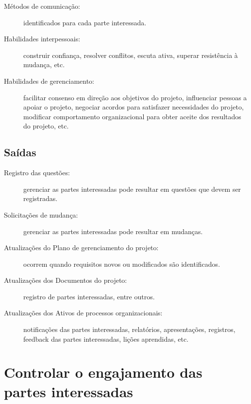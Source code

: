 \begin{description}
	
	\item[Métodos de comunicação:] identificados para cada parte interessada.
	
	\item[Habilidades interpessoais:] construir confiança, resolver conflitos, escuta ativa, superar resistência à mudança, etc.
	
	\item[Habilidades de gerenciamento:] facilitar consenso em direção aos objetivos do projeto, influenciar pessoas a apoiar o projeto, negociar acordos para satisfazer necessidades do projeto, modificar comportamento organizacional para obter aceite dos resultados do projeto, etc.
	
\end{description}

\section{Saídas}

\begin{description}
	
	\item[Registro das questões:] gerenciar as partes interessadas pode resultar em questões que devem ser registradas.
	
	\item[Solicitações de mudança:] gerenciar as partes interessadas pode resultar em mudanças.
	
	\item[Atualizações do Plano de gerenciamento do projeto:] ocorrem quando requisitos novos ou modificados são identificados.
	
	\item[Atualizações dos Documentos do projeto:] registro de partes interessadas, entre outros.
	
	\item[Atualizações dos Ativos de processos organizacionais:] notificações das partes interessadas, relatórios, apresentações, registros, feedback das partes interessadas, lições aprendidas, etc.
	
\end{description}

\chapter{Controlar o engajamento das partes interessadas}

